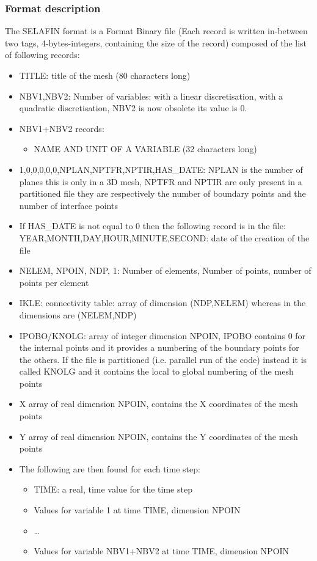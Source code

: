\subsubsection{Format description}
%
The SELAFIN format is a Format Binary file (Each record is written in-between
two tags, 4-bytes-integers, containing the size of the record) composed of
the list of following records:
\begin{itemize}
\item TITLE: title of the mesh (80 characters long)
\item NBV1,NBV2: Number of variables: with a linear discretisation, with a
quadratic discretisation, NBV2 is now obsolete its value is 0.
\item NBV1+NBV2 records:
\begin{itemize}
\item NAME AND UNIT OF A VARIABLE (32 characters long)
\end{itemize}
\item 1,0,0,0,0,0,NPLAN,NPTFR,NPTIR,HAS\_DATE: NPLAN is the number of planes
this is only in a 3D mesh, NPTFR and NPTIR are only present in a partitioned
file they are respectively the number of boundary points and the number of
interface points
\item If HAS\_DATE is not equal to 0 then the following record is in the
file:\\ YEAR,MONTH,DAY,HOUR,MINUTE,SECOND: date of the creation of the file
\item NELEM, NPOIN, NDP, 1: Number of elements, Number of points, number of
points per element
\item IKLE: connectivity table: array of dimension (NDP,NELEM) whereas in
\telemacsystem the dimensions are (NELEM,NDP)
\item IPOBO/KNOLG: array of integer dimension NPOIN, IPOBO contains 0 for the
internal points and it provides a numbering of the boundary points for the
others. If the file is partitioned (i.e. parallel run of the code) instead it
is called KNOLG and it contains the local to global numbering of the mesh
points
\item X array of real dimension NPOIN, contains the X coordinates of the mesh
points
\item Y array of real dimension NPOIN, contains the Y coordinates of the mesh
points
\item The following are then found for each time step:
\begin{itemize}
\item TIME: a real, time value for the time step
\item Values for variable 1 at time TIME, dimension NPOIN
\item \ldots
\item Values for variable NBV1+NBV2 at time TIME, dimension NPOIN
\end{itemize}
\end{itemize}

